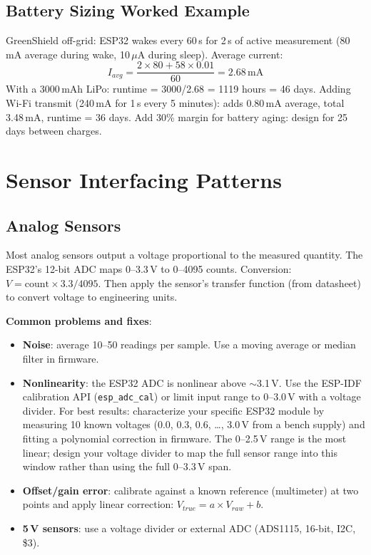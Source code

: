 \subsection{Battery Sizing Worked Example}
GreenShield off-grid: ESP32 wakes every 60\,s for 2\,s of active measurement (80\,mA average during wake, 10\,$\mu$A during sleep). Average current:
\begin{equation}
I_{avg} = \frac{2 \times 80 + 58 \times 0.01}{60} = 2.68\,\text{mA}
\end{equation}
With a 3000\,mAh LiPo: runtime = 3000/2.68 = 1119 hours = 46 days. Adding Wi-Fi transmit (240\,mA for 1\,s every 5 minutes): adds 0.80\,mA average, total 3.48\,mA, runtime = 36 days. Add 30\% margin for battery aging: design for 25 days between charges.


\section{Sensor Interfacing Patterns}

\subsection{Analog Sensors}
Most analog sensors output a voltage proportional to the measured quantity. The ESP32's 12-bit ADC maps 0--3.3\,V to 0--4095 counts. Conversion: $V = \text{count} \times 3.3 / 4095$. Then apply the sensor's transfer function (from datasheet) to convert voltage to engineering units.

\textbf{Common problems and fixes}:
\begin{itemize}[nosep,leftmargin=1.5em]
\item \textbf{Noise}: average 10--50 readings per sample. Use a moving average or median filter in firmware.
\item \textbf{Nonlinearity}: the ESP32 ADC is nonlinear above $\sim$3.1\,V. Use the ESP-IDF calibration API (\texttt{esp\_adc\_cal}) or limit input range to 0--3.0\,V with a voltage divider. For best results: characterize your specific ESP32 module by measuring 10 known voltages (0.0, 0.3, 0.6, \ldots, 3.0\,V from a bench supply) and fitting a polynomial correction in firmware. The 0--2.5\,V range is the most linear; design your voltage divider to map the full sensor range into this window rather than using the full 0--3.3\,V span.
\item \textbf{Offset/gain error}: calibrate against a known reference (multimeter) at two points and apply linear correction: $V_{true} = a \times V_{raw} + b$.
\item \textbf{5\,V sensors}: use a voltage divider or external ADC (ADS1115, 16-bit, I2C, \$3).
\end{itemize}

